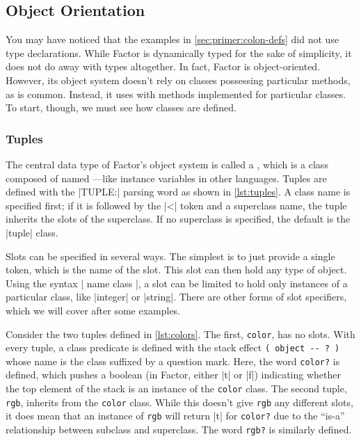 \subsection{Object Orientation}\label{sec:primer:oo}

You may have noticed that the examples in \cref{sec:primer:colon-defs} did not
use type declarations.  While Factor is dynamically typed for the sake of
simplicity, it does not do away with types altogether.  In fact, Factor is
object-oriented.  However, its object system doesn't rely on classes possessing
particular methods, as is common.  Instead, it uses  with
methods implemented for particular classes.  To start, though, we must see how
classes are defined.

\subsubsection{Tuples}


The central data type of Factor's object system is called a , which
is a class composed of named ---like instance variables in other
languages.  Tuples are defined with the \factor|TUPLE:| parsing word as shown
in \vref{lst:tuples}.  A class name is specified first; if it is followed by
the \factor|<| token and a superclass name, the tuple inherits the slots of the
superclass.  If no superclass is specified, the default is the \factor|tuple|
class.

Slots can be specified in several ways.  The simplest is to just provide a
single token, which is the name of the slot.  This slot can then hold any type
of object.  Using the syntax
%
\factor|{ name class }|,
%
a slot can be limited to hold only instances of a particular class, like
\factor|integer| or \factor|string|.  There are other forms of slot specifiers,
which we will cover after some examples.


Consider the two tuples defined in \vref{lst:colors}.  The first,
\Verb|color|, has no slots.  With every tuple, a class predicate is defined
with the stack effect
%
\verb|( object -- ? )|
%
whose name is the class suffixed by a question mark.  Here, the word
\Verb|color?| is defined, which pushes a boolean (in Factor, either
\factor|t| or \factor|f|) indicating whether the top element of the stack is an
instance of the \Verb|color| class.  The second tuple, \Verb|rgb|, inherits
from the \Verb|color| class.  While this doesn't give \Verb|rgb| any
different slots, it does mean that an instance of \Verb|rgb| will return
\factor|t| for \Verb|color?| due to the ``is-a'' relationship between
subclass and superclass.  The word \Verb|rgb?| is similarly defined.

